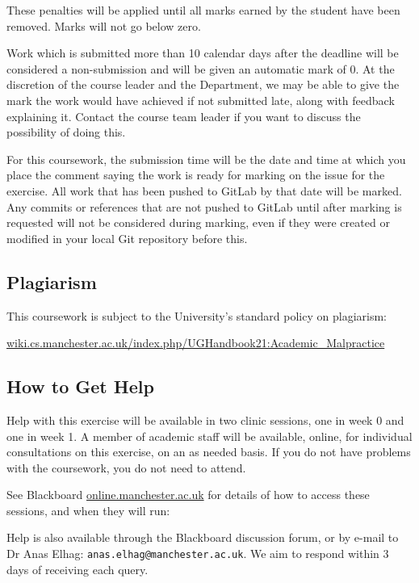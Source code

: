 \documentclass[
]{book}
\begin{document}
These penalties will be applied until all marks earned by the student have been removed. Marks will not go below zero.

Work which is submitted more than 10 calendar days after the deadline will be considered a non-submission and will be given an automatic mark of 0. At the discretion of the course leader and the Department, we may be able to give the mark the work would have achieved if not submitted late, along with feedback explaining it. Contact the course team leader if you want to discuss the possibility of doing this.

For this coursework, the submission time will be the date and time at which you place the comment saying the work is ready for marking on the issue for the exercise. All work that has been pushed to GitLab by that date will be marked. Any commits or references that are not pushed to GitLab until after marking is requested will not be considered during marking, even if they were created or modified in your local Git repository before this.

\hypertarget{plagiarism}{%
\subsection{Plagiarism}\label{plagiarism}}

This coursework is subject to the University's standard policy on plagiarism:

\href{https://wiki.cs.manchester.ac.uk/index.php/UGHandbook21:Academic_Malpractice}{wiki.cs.manchester.ac.uk/index.php/UGHandbook21:Academic\_Malpractice}

\hypertarget{help}{%
\subsection{How to Get Help}\label{help}}

Help with this exercise will be available in two clinic sessions, one in week 0 and one in week 1. A member of academic staff will be available, online, for individual consultations on this exercise, on an as needed basis. If you do not have problems with the coursework, you do not need to attend.

See Blackboard \href{https://online.manchester.ac.uk}{online.manchester.ac.uk} for details of how to access these sessions, and when they will run:

Help is also available through the Blackboard discussion forum, or by e-mail to Dr Anas Elhag: \texttt{anas.elhag@manchester.ac.uk}. We aim to respond within 3 days of receiving each query.
\end{document}
